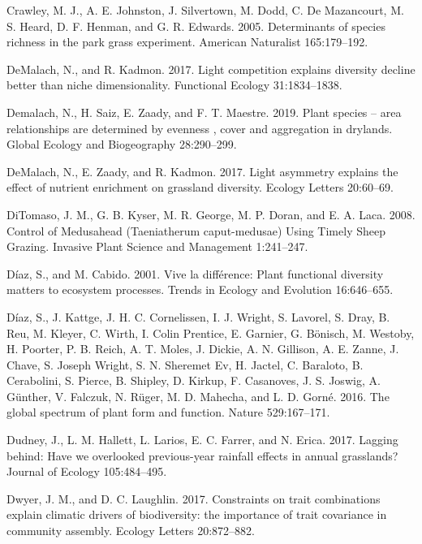 \documentclass[twoside,12pt,final]{ucthesis-CA2012}
\newlength{\cslhangindent}
\newenvironment{cslreferences}%
  {\setlength{\parindent}{0pt}%
  \everypar{\setlength{\hangindent}{\cslhangindent}}\ignorespaces}%
  {\par}
\begin{document}
\begin{ucmainmatter}
\begin{cslreferences}
\leavevmode\hypertarget{ref-Crawley2005}{}%
Crawley, M. J., A. E. Johnston, J. Silvertown, M. Dodd, C. De Mazancourt, M. S. Heard, D. F. Henman, and G. R. Edwards. 2005. Determinants of species richness in the park grass experiment. American Naturalist 165:179--192.

\leavevmode\hypertarget{ref-DeMalach2017b}{}%
DeMalach, N., and R. Kadmon. 2017. Light competition explains diversity decline better than niche dimensionality. Functional Ecology 31:1834--1838.

\leavevmode\hypertarget{ref-demalach2019}{}%
Demalach, N., H. Saiz, E. Zaady, and F. T. Maestre. 2019. Plant species -- area relationships are determined by evenness , cover and aggregation in drylands. Global Ecology and Biogeography 28:290--299.

\leavevmode\hypertarget{ref-DeMalach2017a}{}%
DeMalach, N., E. Zaady, and R. Kadmon. 2017. Light asymmetry explains the effect of nutrient enrichment on grassland diversity. Ecology Letters 20:60--69.

\leavevmode\hypertarget{ref-DiTomaso2008}{}%
DiTomaso, J. M., G. B. Kyser, M. R. George, M. P. Doran, and E. A. Laca. 2008. Control of Medusahead (Taeniatherum caput-medusae) Using Timely Sheep Grazing. Invasive Plant Science and Management 1:241--247.

\leavevmode\hypertarget{ref-Diaz2001}{}%
Díaz, S., and M. Cabido. 2001. Vive la différence: Plant functional diversity matters to ecosystem processes. Trends in Ecology and Evolution 16:646--655.

\leavevmode\hypertarget{ref-Diaz2016}{}%
Díaz, S., J. Kattge, J. H. C. Cornelissen, I. J. Wright, S. Lavorel, S. Dray, B. Reu, M. Kleyer, C. Wirth, I. Colin Prentice, E. Garnier, G. Bönisch, M. Westoby, H. Poorter, P. B. Reich, A. T. Moles, J. Dickie, A. N. Gillison, A. E. Zanne, J. Chave, S. Joseph Wright, S. N. Sheremet Ev, H. Jactel, C. Baraloto, B. Cerabolini, S. Pierce, B. Shipley, D. Kirkup, F. Casanoves, J. S. Joswig, A. Günther, V. Falczuk, N. Rüger, M. D. Mahecha, and L. D. Gorné. 2016. The global spectrum of plant form and function. Nature 529:167--171.

\leavevmode\hypertarget{ref-Dudney2017}{}%
Dudney, J., L. M. Hallett, L. Larios, E. C. Farrer, and N. Erica. 2017. Lagging behind: Have we overlooked previous-year rainfall effects in annual grasslands? Journal of Ecology 105:484--495.

\leavevmode\hypertarget{ref-Dwyer2017}{}%
Dwyer, J. M., and D. C. Laughlin. 2017. Constraints on trait combinations explain climatic drivers of biodiversity: the importance of trait covariance in community assembly. Ecology Letters 20:872--882.


\end{cslreferences}
\end{ucmainmatter}
\end{document}
